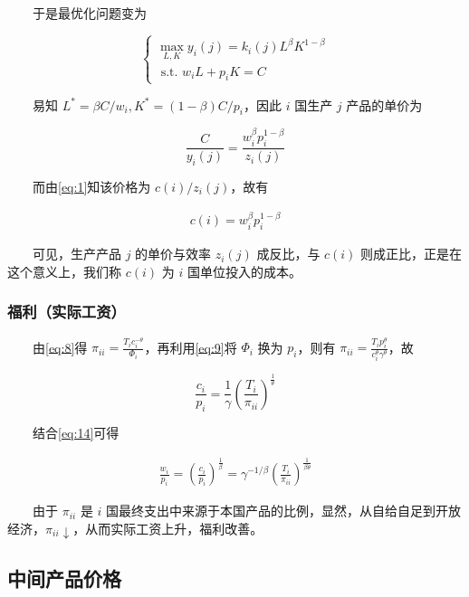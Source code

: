\documentclass[
]{article}
\begin{document}
　　于是最优化问题变为

\[
\left\{\begin{array}{c}
{\max_{L, K} y_{i}(j)=k_{i}(j)L^{\beta}K^{1-\beta}} \\ {\text { s.t. } w_{i}L + p_{i}K = C}
\end{array}\right.
\]

　　易知 \(L^*=\beta C/w_i, K^*=(1-\beta)C/p_i\)，因此 \(i\) 国生产 \(j\) 产品的单价为

\[\frac{C}{y_{i}(j)}=\frac{w_{i}^{\beta}p_{i}^{1-\beta}}{z_{i}(j)}\]

　　而由\eqref{eq:1}知该价格为 \(c(i)/{z_{i}(j)}\)，故有

\begin{align}
c(i)=w_{i}^{\beta}p_{i}^{1-\beta} \label{eq:14}
\end{align}

　　可见，生产产品 \(j\) 的单价与效率 \(z_{i}(j)\) 成反比，与 \(c(i)\) 则成正比，正是在这个意义上，我们称 \(c(i)\) 为 \(i\) 国单位投入的成本。

\hypertarget{ux798fux5229ux5b9eux9645ux5de5ux8d44}{%
\subsubsection{福利（实际工资）}\label{ux798fux5229ux5b9eux9645ux5de5ux8d44}}

　　由\eqref{eq:8}得 \(\pi_{ii}=\frac{T_{i}c_{i}^{-\theta}}{\Phi_{i}}\)，再利用\eqref{eq:9}将 \(\Phi_{i}\) 换为 \(p_{i}\)，则有 \(\pi_{ii}=\frac{T_{i}p_{i}^{\theta}}{c_{i}^{\theta}\gamma^{\theta}}\)，故

\[\frac{c_i}{p_i}=\frac{1}{\gamma}\left(\frac{T_i}{\pi_{ii}}\right)^{\frac{1}{\theta}}\]

　　结合\eqref{eq:14}可得

\begin{align}
\frac{w_i}{p_i}=\left(\frac{c_i}{p_{i}}\right)^{\frac{1}{\beta}}=\gamma^{-1/\beta}\left(\frac{T_i}{\pi_{ii}}\right)^{\frac{1}{\beta\theta}} \label{eq:15}
\end{align}

　　由于 \(\pi_{ii}\) 是 \(i\) 国最终支出中来源于本国产品的比例，显然，从自给自足到开放经济，\(\pi_{ii} \downarrow\)，从而实际工资上升，福利改善。

\hypertarget{ux4e2dux95f4ux4ea7ux54c1ux4ef7ux683c}{%
\subsection{中间产品价格}\label{ux4e2dux95f4ux4ea7ux54c1ux4ef7ux683c}}
\end{document}
